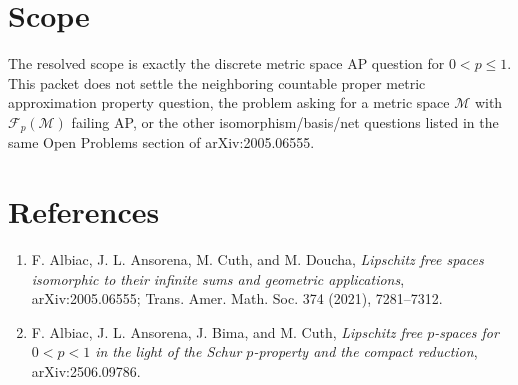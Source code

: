 \documentclass[11pt]{article}
\newcommand{\Fp}{\mathcal F_p}
\newcommand{\M}{\mathcal M}
\begin{document}
\section*{Scope}

The resolved scope is exactly the discrete metric space AP question for
$0<p\leq 1$. This packet does not settle the neighboring countable proper
metric approximation property question, the problem asking for a metric space
$\M$ with $\Fp(\M)$ failing AP, or the other isomorphism/basis/net questions
listed in the same Open Problems section of arXiv:2005.06555.

\section*{References}

\begin{enumerate}
\item F. Albiac, J. L. Ansorena, M. Cuth, and M. Doucha,
\emph{Lipschitz free spaces isomorphic to their infinite sums and geometric
applications}, arXiv:2005.06555; Trans. Amer. Math. Soc. 374 (2021),
7281--7312.
\item F. Albiac, J. L. Ansorena, J. Bima, and M. Cuth,
\emph{Lipschitz free $p$-spaces for $0<p<1$ in the light of the Schur
$p$-property and the compact reduction}, arXiv:2506.09786.
\end{enumerate}
\end{document}
